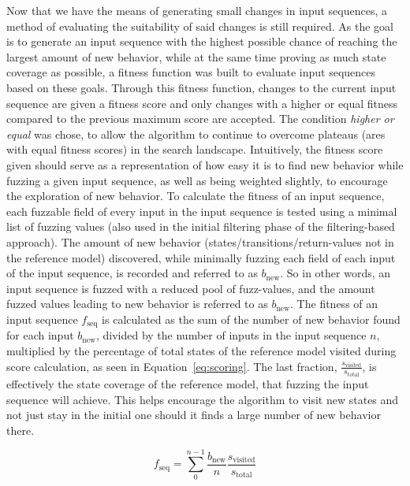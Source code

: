 Now that we have the means of generating small changes in input sequences, a method of evaluating the suitability of said changes is still required. As the goal is to generate an input sequence with the highest possible chance of reaching the largest amount of new behavior, while at the same time proving as much state coverage as possible, a fitness function was built to evaluate input sequences based on these goals. Through this fitness function, changes to the current input sequence are given a fitness score and only changes with a higher or equal fitness compared to the previous maximum score are accepted. The condition \emph{higher or equal} was chose, to allow the algorithm to continue to overcome plateaus (ares with equal fitness scores) in the search landscape. Intuitively, the fitness score given should serve as a representation of how easy it is to find new behavior while fuzzing a given input sequence, as well as being weighted slightly, to encourage the exploration of new behavior. To calculate the fitness of an input sequence, each fuzzable field of every input in the input sequence is tested using a minimal list of fuzzing values (also used in the initial filtering phase of the filtering-based approach). The amount of new behavior (states/transitions/return-values not in the reference model) discovered, while minimally fuzzing each field of each input of the input sequence, is recorded and referred to as $b_\mathrm{new}$. So in other words, an input sequence is fuzzed with a reduced pool of fuzz-values, and the amount fuzzed values leading to new behavior is referred to as $b_\mathrm{new}$. The fitness of an input sequence $f_\mathrm{seq}$ is calculated as the sum of the number of new behavior found for each input $b_\mathrm{new}$, divided by the number of inputs in the input sequence $n$, multiplied by the percentage of total states of the reference model visited during score calculation, as seen in Equation~\ref{eq:scoring}. The last fraction, $\frac{s_\mathrm{visited}}{s_\mathrm{total}}$, is effectively the state coverage of the reference model, that fuzzing the input sequence will achieve. This helps encourage the algorithm to visit new states and not just stay in the initial one should it finds a large number of new behavior there.

\begin{equation}f_\mathrm{seq} = \sum_{0}^{n-1} \frac{b_\mathrm{new}}{n} \frac{s_\mathrm{visited}}{s_\mathrm{total}} \end{equation} \label{eq:scoring}

